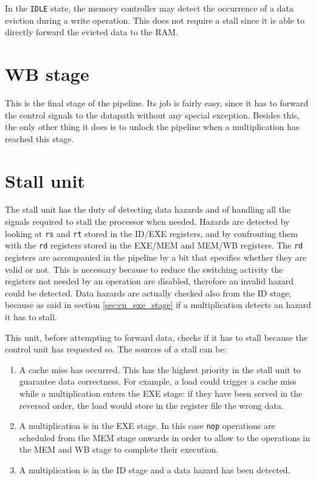 In the \verb|IDLE| state, the memory controller may detect the occurrence of a data eviction during a write operation. This does not require a stall since it is able to directly forward the evicted data to the RAM.

\section{WB stage}

This is the final stage of the pipeline. Its job is fairly easy, since it has to forward the control signals to the datapath without any special exception. Besides this, the only other thing it does is to unlock
the pipeline when a multiplication has reached this stage.

\section{Stall unit}
\label{sec:stall_unit}

The stall unit has the duty of detecting data hazards and of handling all the signals required to stall the processor when needed. Hazards are detected by looking at \verb|rs| and \verb|rt| stored in the
ID/EXE registers, and by confronting them with the \verb|rd| registers stored in the EXE/MEM and MEM/WB registers. The \verb|rd| registers are accompanied in the pipeline by a bit that specifies whether
they are valid or not. This is necessary because to reduce the switching activity the registers not needed by an operation are disabled, therefore an invalid hazard could be detected.
Data hazards are actually checked also from the ID stage, because as said in section \ref{sec:cu_exe_stage} if a multiplication detects an hazard it has to stall.

This unit, before attempting to forward data, checks if it has to stall because the control unit has requested so. The sources of a stall can be:

\begin{enumerate}
    \item A cache miss has occurred. This has the highest priority in the stall unit to guarantee data correctness. For example, a load could trigger a cache miss while a multiplication enters the EXE stage:
    if they have been served in the reversed order, the load would store in the register file the wrong data.

    \item A multiplication is in the EXE stage. In this case \verb|nop| operations are scheduled from the MEM stage onwards in order to allow to the operations in the MEM and WB stage to complete their execution.
    
    \item A multiplication is in the ID stage and a data hazard has been detected. 
\end{enumerate}

